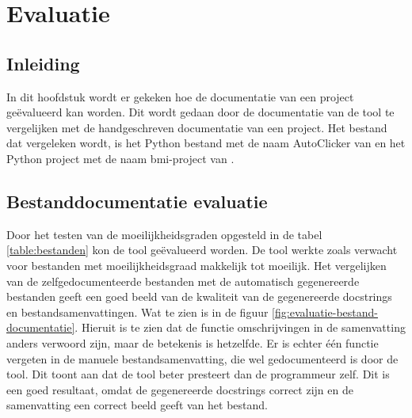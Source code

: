 \section{Evaluatie}
\label{sec:project-documentatie-evaluatie}

\subsection{Inleiding}
\label{sec:project-documentatie-evaluatie-inleiding}

In dit hoofdstuk wordt er gekeken hoe de documentatie van een project geëvalueerd kan worden.
Dit wordt gedaan door de documentatie van de tool te vergelijken met de handgeschreven documentatie van een project.
Het bestand dat vergeleken wordt, is het Python bestand met de naam AutoClicker van \textcite{Waegeneer2022} en het Python project met de naam bmi-project van \textcite{Simmons2019}.

\subsection{Bestanddocumentatie evaluatie}
\label{sec:project-documentatie-evaluatie-bestand}

Door het testen van de moeilijkheidsgraden opgesteld in de tabel \ref{table:bestanden} kon de tool geëvalueerd worden.
De tool werkte zoals verwacht voor bestanden met moeilijkheidsgraad makkelijk tot moeilijk.
Het vergelijken van de zelfgedocumenteerde bestanden met de automatisch gegenereerde bestanden geeft een goed beeld van de kwaliteit van de gegenereerde docstrings en bestandsamenvattingen.
Wat te zien is in de figuur \ref{fig:evaluatie-bestand-documentatie}.
Hieruit is te zien dat de functie omschrijvingen in de samenvatting anders verwoord zijn, maar de betekenis is hetzelfde.
Er is echter één functie vergeten in de manuele bestandsamenvatting, die wel gedocumenteerd is door de tool.
Dit toont aan dat de tool beter presteert dan de programmeur zelf.
Dit is een goed resultaat, omdat de gegenereerde docstrings correct zijn en de samenvatting een correct beeld geeft van het bestand.

